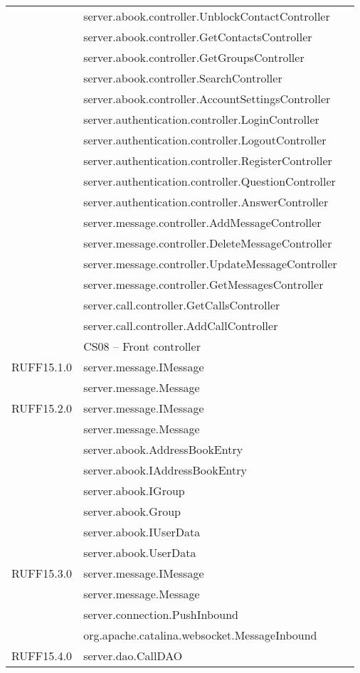 \begin{center}
\begin{longtable}{lp{}l}
& server.abook.controller.UnblockContactController\\
& server.abook.controller.GetContactsController\\
& server.abook.controller.GetGroupsController\\
& server.abook.controller.SearchController\\
& server.abook.controller.AccountSettingsController\\
& server.authentication.controller.LoginController\\
& server.authentication.controller.LogoutController\\
& server.authentication.controller.RegisterController\\
& server.authentication.controller.QuestionController\\
& server.authentication.controller.AnswerController\\
& server.message.controller.AddMessageController\\
& server.message.controller.DeleteMessageController\\
& server.message.controller.UpdateMessageController\\
& server.message.controller.GetMessagesController\\
& server.call.controller.GetCallsController\\
& server.call.controller.AddCallController\\
  & CS08 -- Front controller \\
RUFF15.1.0 & server.message.IMessage\\
& server.message.Message\\
RUFF15.2.0 & server.message.IMessage\\
& server.message.Message\\
 & server.abook.AddressBookEntry\\
& server.abook.IAddressBookEntry\\
& server.abook.IGroup\\
& server.abook.Group\\
& server.abook.IUserData\\
& server.abook.UserData\\
RUFF15.3.0 & server.message.IMessage\\
& server.message.Message\\
 & server.connection.PushInbound\\
& org.apache.catalina.websocket.MessageInbound\\
RUFF15.4.0 & server.dao.CallDAO\\

\end{longtable}
\end{center}
